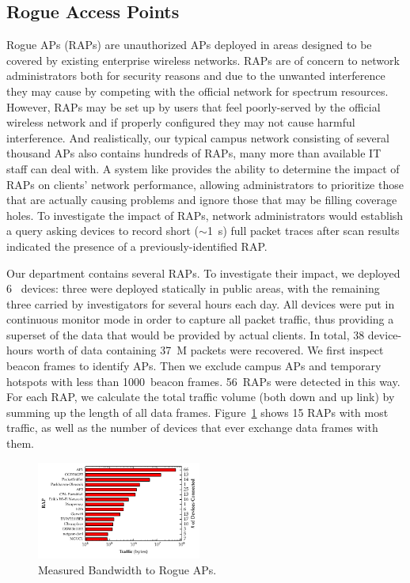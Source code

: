 \subsection{Rogue Access Points}
\label{subsec-rogue}

Rogue APs (RAPs) are unauthorized APs deployed in areas designed to be
covered by existing enterprise wireless networks. RAPs are of concern to
network administrators both for security reasons and due to the unwanted
interference they may cause by competing with the official network for
spectrum resources. However, RAPs may be set up by users that feel
poorly-served by the official wireless network and if properly configured
they may not cause harmful interference. And realistically, our typical
campus network consisting of several thousand APs also contains hundreds of
RAPs, many more than available IT staff can deal with. A system like
\PS{} provides the ability to determine the impact of RAPs on clients'
network performance, allowing administrators to prioritize those that are
actually causing problems and ignore those that may be filling coverage
holes. To investigate the impact of RAPs, network administrators would
establish a \PS{} query asking devices to record short ($\sim$1~s) full packet
traces after scan results indicated the presence of a previously-identified
RAP.

Our department contains several RAPs. To investigate their impact, we
deployed 6~\PS{} devices: three were deployed statically in public areas,
with the remaining three carried by investigators for several hours each day.
All devices were put in continuous monitor mode in order to capture all
packet traffic, thus providing a superset of the data that would be provided
by actual \PS{} clients. In total, 38 device-hours worth of data containing
37~M packets were recovered. We first inspect beacon frames to identify APs.
Then we exclude campus APs and temporary hotspots with less than 1000~beacon
frames. 56~RAPs were detected in this way. For each RAP, we calculate the
total traffic volume (both down and up link) by summing up the length of all
data frames. Figure~\ref{fig:rap} shows 15 RAPs with most traffic, as well as
the number of devices that ever exchange data frames with them.


\begin{figure}[t!]
  \centering
  \includegraphics[width=0.48\textwidth]{./figures/RAPTrafficGraph.pdf}
  \vspace*{-9mm}
  \caption{Measured Bandwidth to Rogue APs.}
  \label{fig:rap}
  \vspace*{-3mm}
\end{figure}

